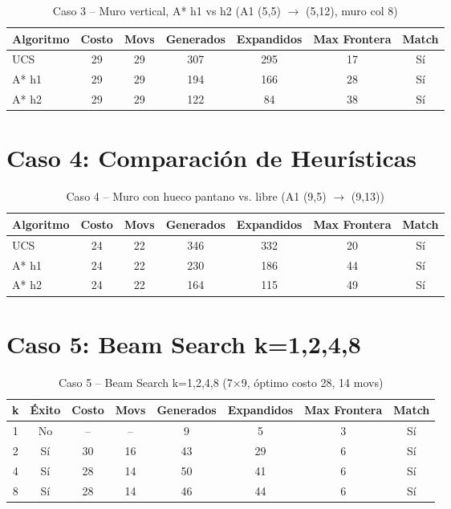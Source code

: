 \begin{table}[H]
\centering
\caption{Caso 3 -- Muro vertical, A* h1 vs h2 (A1 (5,5) $\to$ (5,12), muro col 8)}
\begin{tabular}{lcccccc}
\toprule
Algoritmo & Costo & Movs & Generados & Expandidos & Max Frontera & Match \\
\midrule
UCS & 29 & 29 & 307 & 295 & 17 & Sí \\
A* h1 & 29 & 29 & 194 & 166 & 28 & Sí \\
A* h2 & 29 & 29 & 122 & 84 & 38 & Sí \\
\bottomrule
\end{tabular}
\end{table}
\label{tab:caso3-full}


\section{Caso 4: Comparación de Heurísticas}
\label{sec:tabla-caso4}

\begin{table}[H]
\centering
\caption{Caso 4 -- Muro con hueco pantano vs. libre (A1 (9,5) $\to$ (9,13))}
\begin{tabular}{lcccccc}
\toprule
Algoritmo & Costo & Movs & Generados & Expandidos & Max Frontera & Match \\
\midrule
UCS & 24 & 22 & 346 & 332 & 20 & Sí \\
A* h1 & 24 & 22 & 230 & 186 & 44 & Sí \\
A* h2 & 24 & 22 & 164 & 115 & 49 & Sí \\
\bottomrule
\end{tabular}
\end{table}
\label{tab:caso4-full}


\section{Caso 5: Beam Search k=1,2,4,8}
\label{sec:tabla-caso5}

\begin{table}[H]
\centering
\caption{Caso 5 -- Beam Search k=1,2,4,8 (7$\times$9, óptimo costo 28, 14 movs)}
\begin{tabular}{cccccccc}
\toprule
k & Éxito & Costo & Movs & Generados & Expandidos & Max Frontera & Match \\
\midrule
1 & No & -- & -- & 9 & 5 & 3 & Sí \\
2 & Sí & 30 & 16 & 43 & 29 & 6 & Sí \\
4 & Sí & 28 & 14 & 50 & 41 & 6 & Sí \\
8 & Sí & 28 & 14 & 46 & 44 & 6 & Sí \\
\bottomrule
\end{tabular}
\end{table}
\label{tab:caso5-full}


